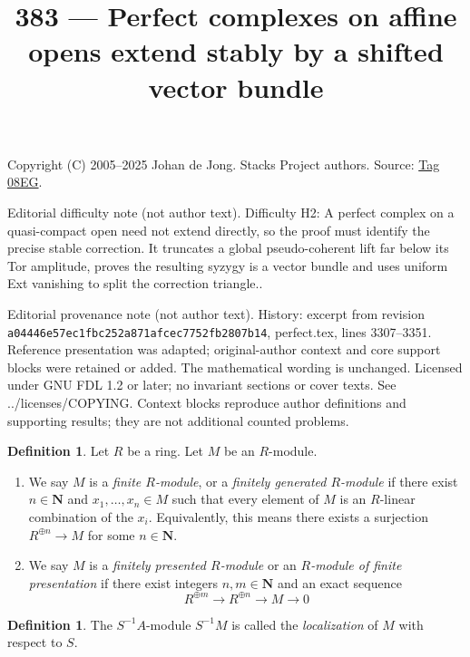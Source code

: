 \documentclass{amsart}
\theoremstyle{plain}
\theoremstyle{definition}
\newtheorem{definition}[subsection]{Definition}
\theoremstyle{remark}
\numberwithin{equation}{subsection}
\begin{document}
\title[Stacks Project, Tag 08EG]{383 --- Perfect complexes on affine opens extend stably by a shifted vector bundle}
\maketitle
\noindent Copyright (C) 2005--2025 Johan de Jong. Stacks Project authors. Source: \href{https://stacks.math.columbia.edu/tag/08EG}{Tag 08EG}.

\noindent Editorial difficulty note (not author text). Difficulty H2: A perfect complex on a quasi-compact open need not extend directly, so the proof must identify the precise stable correction. It truncates a global pseudo-coherent lift far below its Tor amplitude, proves the resulting syzygy is a vector bundle and uses uniform Ext vanishing to split the correction triangle..

\noindent Editorial provenance note (not author text). History: excerpt from revision \texttt{a0444\allowbreak 6e57e\allowbreak c1fbc\allowbreak 252a8\allowbreak 71afc\allowbreak ec775\allowbreak 2fb28\allowbreak 07b14}, perfect.tex, lines 3307--3351. Reference presentation was adapted; original-author context and core support blocks were retained or added. The mathematical wording is unchanged. Licensed under GNU FDL 1.2 or later; no invariant sections or cover texts. See ../licenses/COPYING. Context blocks reproduce author definitions and supporting results; they are not additional counted problems.

\begin{definition}
\label{algebra-definition-module-finite-type}
Let $R$ be a ring. Let $M$ be an $R$-module.
\begin{enumerate}
\item We say $M$ is a {\it finite $R$-module}, or a {\it finitely generated
$R$-module} if there exist $n \in \mathbf{N}$ and $x_1, \ldots, x_n \in M$
such that every element of $M$ is an $R$-linear combination of the $x_i$.
Equivalently, this means there exists a surjection
$R^{\oplus n} \to M$ for some $n \in \mathbf{N}$.
\item We say $M$ is a {\it finitely presented $R$-module} or an
{\it $R$-module of finite presentation} if there exist integers
$n, m \in \mathbf{N}$ and an exact sequence
$$
R^{\oplus m} \longrightarrow R^{\oplus n} \longrightarrow M \longrightarrow 0
$$
\end{enumerate}
\end{definition}

\begin{definition}
\label{algebra-definition-localization-module}
The $S^{-1}A$-module $S^{-1}M$ is called the {\it localization} of $M$
with respect to $S$.
\end{definition}
\end{document}
